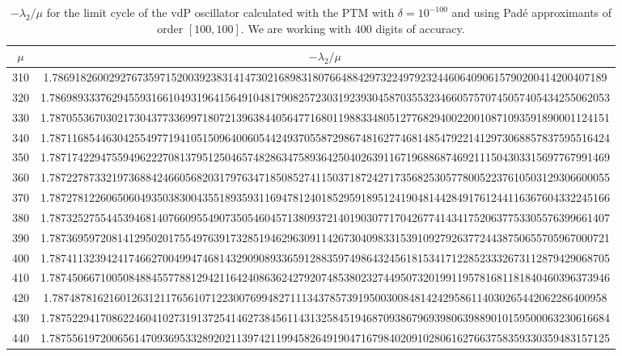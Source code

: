 \documentclass[final]{article}
\begin{document}
\begin{table}
\caption{$-\lambda_2/\mu$ for the limit cycle of the vdP oscillator calculated with the PTM with $\delta=10^{-100}$ and using Pad\'e approximants of order $[100,100]$. We are working with $400$ digits of accuracy. }
\bigskip
\label{table_Lyap_vdP3}
\begin{center}
\begin{tabular}{|c|c|}
\hline
$\mu$ &   $-\lambda_2/\mu$    \\
\hline
310 &   1.78691826002927673597152003923831414730216898318076648842973224979232446064090615790200414200407189    \\
320 &   1.786989333762945593166104931964156491048179082572303192393045870355323466057570745057405434255062053   \\
330 &   1.787055367030217304377336997180721396384405647716801198833480512776829400220010871093591890001124151   \\
340 &   1.787116854463042554977194105150964006054424937055872986748162774681485479221412973068857837595516424   \\
350 &   1.787174229475594962227081379512504657482863475893642504026391167196886874692111504303315697767991469   \\
360 &   1.787227873321973688424660568203179763471850852741150371872427173568253057780052237610503129306600055   \\
370 &   1.787278122606506049350383004355189359311694781240185295918951241904814428491761244116367604332245166   \\
380 &   1.787325275544539468140766095549073505460457138093721401903077170426774143417520637753305576399661407   \\
390 &   1.787369597208141295020175549763917328519462963091142673040983315391092792637724438750655705967000721   \\
400 &   1.787411323942417466270049947468143290908933659128835974986432456181534171228523332673112879429068705   \\
410 &   1.787450667100508488455778812942116424086362427920748538023274495073201991195781681181840460396373946   \\
420 &   1.78748781621601263121176561071223007699482711134378573919500300848142429586114030265442062286400958    \\
430 &   1.787522941708622460410273191372541462738456114313258451946870938679693980639889010159500063230616684   \\
440 &   1.787556197200656147093695332892021139742119945826491904716798402091028061627663758359330359483157125   \\

\end{tabular}
\end{center}
\end{table}
\end{document}
